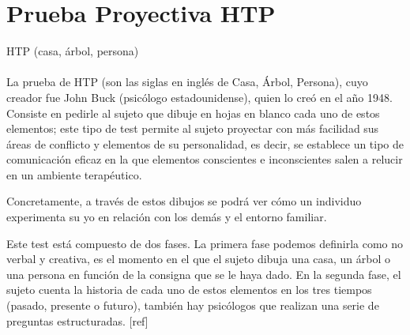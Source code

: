 \section{Prueba Proyectiva HTP}

HTP (casa, árbol, persona)
\\\\
La prueba de HTP (son las siglas en inglés de Casa, Árbol, Persona), cuyo creador fue John Buck (psicólogo estadounidense), quien lo creó en el año 1948. Consiste en pedirle al sujeto que dibuje en hojas en blanco cada uno de estos elementos; este tipo de test permite al sujeto proyectar con más facilidad sus áreas de conflicto y elementos de su personalidad, es decir, se establece un tipo de comunicación eficaz en la que elementos conscientes e inconscientes salen a relucir en un ambiente terapéutico.

Concretamente, a través de estos dibujos se podrá ver cómo un individuo experimenta su yo en relación con los demás y el entorno familiar.

Este test está compuesto de dos fases. La primera fase podemos definirla como no verbal y creativa, es el momento en el que el sujeto dibuja una casa, un árbol o una persona en función de la consigna que se le haya dado. En la segunda fase, el sujeto cuenta la historia de cada uno de estos elementos en los tres tiempos (pasado, presente o futuro), también hay psicólogos que realizan una serie de preguntas estructuradas. [ref]
\\\\\\\\\\